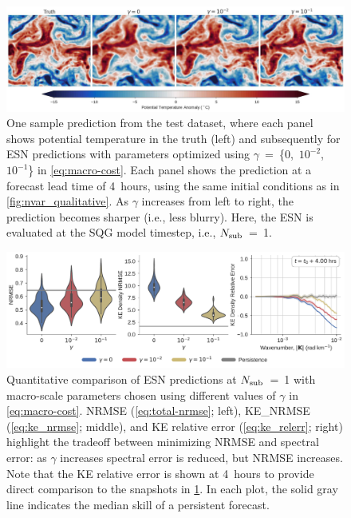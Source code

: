 \documentclass[draft]{agujournal2019}
\begin{document}

\begin{figure}
    \centering
    \includegraphics[width=\textwidth]{figures/rc_qualitative_gamma.jpg}
    \caption{
        One sample prediction from the test dataset, where each panel shows
        potential temperature in the truth (left) and subsequently for
        ESN predictions with parameters optimized using
        $\gamma$~=~\{0,~$10^{-2}$,~$10^{-1}$\} in \cref{eq:macro-cost}.
        Each panel shows the prediction at a forecast lead time of 4~hours,
        using the same initial conditions as in \cref{fig:nvar_qualitative}.
        As $\gamma$ increases from left to right, the prediction becomes sharper
        (i.e., less blurry).
        Here, the ESN is evaluated at the SQG model timestep, i.e., $N_\text{sub}$~=~1.
    }
    \label{fig:rc_qualitative_nsub01}
\end{figure}

\begin{figure}
    \centering
    \includegraphics[width=\textwidth]{figures/rc_all_nsub01.pdf}
    \caption{
        Quantitative comparison of ESN predictions at $N_\text{sub}$~=~1 with macro-scale
        parameters
        chosen using different values of $\gamma$ in \cref{eq:macro-cost}.
        NRMSE (\cref{eq:total-nrmse}; left), KE\_NRMSE (\cref{eq:ke_nrmse};
        middle), and
        KE relative error (\cref{eq:ke_relerr}; right) highlight the tradeoff
        between minimizing NRMSE and spectral error: as $\gamma$ increases
        spectral error is reduced, but NRMSE increases.
        Note that the KE relative error is shown at 4~hours to provide
        direct comparison to the snapshots in \cref{fig:rc_qualitative_nsub01}.
        In each plot, the solid gray line indicates the median skill of a persistent
        forecast.
    }
    \label{fig:rc_quantiative_nsub01}
\end{figure}
\end{document}
